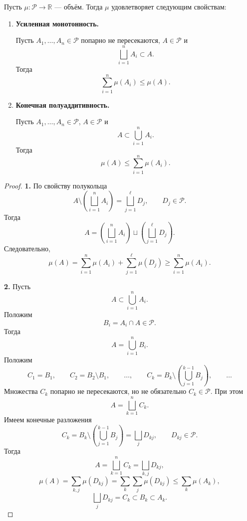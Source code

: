 \label{ticket:18}

\begin{theorem}
Пусть \(\mu:\mathcal{P}\to\mathbb{R}\) --- объём.
Тогда \(\mu\) удовлетворяет следующим свойствам:
\begin{enumerate}
    \item \textbf{Усиленная монотонность.}

    Пусть \(A_1,\ldots,A_n\in\mathcal{P}\) попарно
    не пересекаются, \(A\in\mathcal{P}\) и
    \[
        \bigsqcup_{i=1}^{n}A_i\subset A.
    \]
    Тогда
    \[
        \sum_{i=1}^{n}\mu(A_i)\le\mu(A).
    \]

    \item \textbf{Конечная полуаддитивность.}

    Пусть \(A_1,\ldots,A_n\in\mathcal{P}\),
    \(A\in\mathcal{P}\) и
    \[
        A\subset\bigcup_{i=1}^{n}A_i.
    \]
    Тогда
    \[
        \mu(A)\le\sum_{i=1}^{n}\mu(A_i).
    \]
\end{enumerate}
\end{theorem}

\begin{proof}
\noindent\textbf{1.}
По свойству полукольца
\[
    A\setminus\left(\bigsqcup_{i=1}^{n}A_i\right)
    =\bigsqcup_{j=1}^{\ell}D_j,
    \qquad D_j\in\mathcal{P}.
\]
Тогда
\[
    A=
    \left(\bigsqcup_{i=1}^{n}A_i\right)
    \sqcup
    \left(\bigsqcup_{j=1}^{\ell}D_j\right).
\]
Следовательно,
\[
    \mu(A)
    =\sum_{i=1}^{n}\mu(A_i)
     +\sum_{j=1}^{\ell}\mu(D_j)
    \ge\sum_{i=1}^{n}\mu(A_i).
\]

\medskip
\noindent\textbf{2.}
Пусть
\[
    A\subset\bigcup_{i=1}^{n}A_i.
\]
Положим
\[
    B_i=A_i\cap A\in\mathcal{P}.
\]
Тогда
\[
    A=\bigcup_{i=1}^{n}B_i.
\]
Положим
\[
    C_1=B_1,\qquad
    C_2=B_2\setminus B_1,\qquad
    \ldots,\qquad
    C_k=B_k\setminus
    \left(\bigcup_{j=1}^{k-1}B_j\right),\qquad\ldots
\]
Множества \(C_k\) попарно не пересекаются,
но не обязательно \(C_k\in\mathcal{P}\). При этом
\[
    A=\bigsqcup_{k=1}^{n}C_k.
\]
Имеем конечные разложения
\[
    C_k
    =B_k\setminus\left(\bigcup_{j=1}^{k-1}B_j\right)
    =\bigsqcup_j D_{kj},
    \qquad D_{kj}\in\mathcal{P}.
\]
Тогда
\[
    A=\bigsqcup_{k=1}^{n}C_k
     =\bigsqcup_{k,j}D_{kj},
\]
\[
    \mu(A)
    =\sum_{k,j}\mu(D_{kj})
    =\sum_k\sum_j\mu(D_{kj})
    \le\sum_k\mu(A_k),
\]
\[
    \bigsqcup_j D_{kj}
    =C_k\subset B_k\subset A_k.
\]
\end{proof}